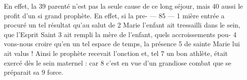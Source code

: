 En effet, la	 
39	 	parenté n'est pas la seule cause de ce long séjour, mais	 
40	 	aussi le profit d'un si grand prophète. En effet, si la pre-	 
 	--- 85 ---	 
1	 	mière entrée a procuré un tel résultat qu'au salut de	 
2	 	Marie l'enfant ait tressailli dans le sein, que l'Esprit Saint	 
3	 	ait rempli la mère de l'enfant, quels accroissements pou-	 
4	 	vons-nous croire qu'en un tel espace de temps, la présence	 
5	 	de sainte Marie lui ait valus !
 Ainsi le prophète recevait l'onction et, tel	 
7	 	un bon athlète, était exercé dès le sein maternel : car	 
8	 	c'est en vue d'un grandiose combat que se préparait sa	 
9	 	force.